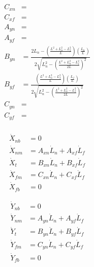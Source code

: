 \documentclass[11pt, landscape]{article}
\begin{document}
\begin{align}
  C_{xn} &= \\
  C_{xf} &= \\
  A_{yn} &= \\
  A_{yf} &= \\
  B_{yn} &= \frac{2L_n - \left(\frac{L^2+L_n^2-L_f^2}{L}\right)\left(\frac{L_n}{L}\right)}{2\sqrt{L_n^2 - \left(\frac{L^2+L_n^2-L_f^2}{2L}\right)^2}}\\
  B_{yf} &= \frac{\left(\frac{L^2+L_n^2-L_f^2}{L}\right)\left(\frac{L_f}{L}\right)}{2\sqrt{L_n^2 - \left(\frac{L^2+L_n^2-L_f^2}{2L}\right)^2}}\\
  C_{yn} &= \\
  C_{yf} &= \\
\end{align}

\begin{align}
  \dot{X}_{nb} &= 0 \\
  \dot{X}_{nm} &= A_{xn}\dot{L}_n + A_{xf}\dot{L}_f\\
  \dot{X}_{t } &= B_{xn}\dot{L}_n + B_{xf}\dot{L}_f\\
  \dot{X}_{fm} &= C_{xn}\dot{L}_n + C_{xf}\dot{L}_f\\
  \dot{X}_{fb} &= 0
\end{align}  

\begin{align}                                                                          
  \dot{Y}_{nb} &= 0 \\                           
  \dot{Y}_{nm} &= A_{yn}\dot{L}_n + A_{yf}\dot{L}_f\\
  \dot{Y}_{t}  &= B_{yn}\dot{L}_n + B_{yf}\dot{L}_f\\
  \dot{Y}_{fm} &= C_{yn}\dot{L}_n + C_{yf}\dot{L}_f\\
  \dot{Y}_{fb} &= 0 \\
\end{align}
\end{document}
